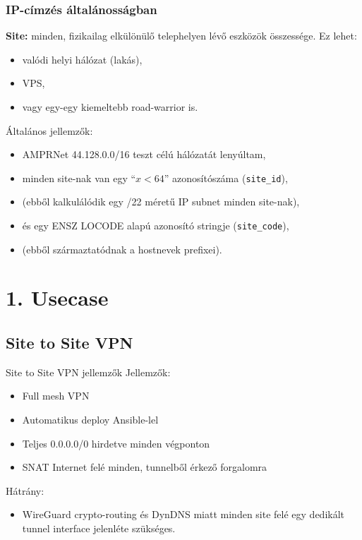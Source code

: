 \documentclass[aspectratio=169]{beamer}
\begin{document}
\begin{frame}
	\frametitle{IP-címzés általánosságban}

	\textbf {Site:} minden, fizikailag elkülönülő telephelyen lévő eszközök összessége. Ez lehet:
	\pause
	\begin{itemize}
		\item valódi helyi hálózat (lakás),
	\pause
		\item VPS,
	\pause
		\item vagy egy-egy kiemeltebb road-warrior is.
	\end{itemize}
	\pause

	Általános jellemzők:
	\pause

	\begin{itemize}
		\item	AMPRNet\texttrademark\,\,44.128.0.0/16 teszt célú hálózatát lenyúltam,
	\pause
\item minden site-nak van egy ``$x<64$'' azonosítószáma (\texttt {site\_id}),
	\pause
\item	(ebből kalkulálódik egy /22 méretű IP subnet minden site-nak),
	\pause
\item és egy ENSZ LOCODE alapú azonosító stringje (\texttt {site\_code}),
	\pause
	\item	(ebből származtatódnak a hostnevek prefixei).
	\end{itemize}

\end{frame}

\section{1. Usecase}
\begin{frame}[plain]
	\fontsize{50}{60} 
\end{frame}
\subsection{Site to Site VPN}

\begin{frame}{Site to Site VPN jellemzők}
	Jellemzők:
	\begin{itemize}
		\item Full mesh VPN
			\pause
		\item Automatikus deploy Ansible-lel
			\pause
		\item Teljes 0.0.0.0/0 hirdetve minden végponton
			\pause
		\item SNAT Internet felé minden, tunnelből érkező forgalomra
	\end{itemize}
			\pause
	Hátrány:
	\begin{itemize}
			\pause
		\item WireGuard crypto-routing és DynDNS miatt minden site felé egy dedikált tunnel interface jelenléte szükséges.
	\end{itemize}
\end{frame}
\end{document}
